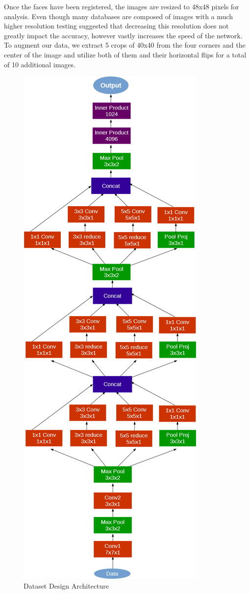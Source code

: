 Once the faces have been registered, the images are resized to 48x48 pixels for analysis. Even though many databases are composed of images with a much higher resolution testing suggested that decreasing this resolution does not greatly impact the accuracy, however vastly increases the speed of the network. To augment our data, we extract 5 crops of 40x40 from the four corners and the center of the image and utilize both of them and their horizontal flips for a total of 10 additional images.
\begin{figure}[h]
	\centering\includegraphics[scale=1.5]{images/dataset_design.png}
	\caption{Dataset Design Architecture}
\end{figure}


